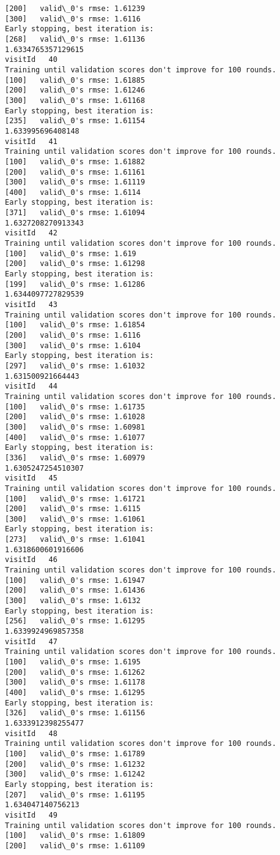 \documentclass[11pt]{article}
\begin{document}
\begin{Verbatim}[commandchars=\\\{\}]
[200]	valid\_0's rmse: 1.61239
[300]	valid\_0's rmse: 1.6116
Early stopping, best iteration is:
[268]	valid\_0's rmse: 1.61136
1.6334765357129615
visitId   40
Training until validation scores don't improve for 100 rounds.
[100]	valid\_0's rmse: 1.61885
[200]	valid\_0's rmse: 1.61246
[300]	valid\_0's rmse: 1.61168
Early stopping, best iteration is:
[235]	valid\_0's rmse: 1.61154
1.633995696408148
visitId   41
Training until validation scores don't improve for 100 rounds.
[100]	valid\_0's rmse: 1.61882
[200]	valid\_0's rmse: 1.61161
[300]	valid\_0's rmse: 1.61119
[400]	valid\_0's rmse: 1.6114
Early stopping, best iteration is:
[371]	valid\_0's rmse: 1.61094
1.6327208270913343
visitId   42
Training until validation scores don't improve for 100 rounds.
[100]	valid\_0's rmse: 1.619
[200]	valid\_0's rmse: 1.61298
Early stopping, best iteration is:
[199]	valid\_0's rmse: 1.61286
1.6344097727829539
visitId   43
Training until validation scores don't improve for 100 rounds.
[100]	valid\_0's rmse: 1.61854
[200]	valid\_0's rmse: 1.6116
[300]	valid\_0's rmse: 1.6104
Early stopping, best iteration is:
[297]	valid\_0's rmse: 1.61032
1.631500921664443
visitId   44
Training until validation scores don't improve for 100 rounds.
[100]	valid\_0's rmse: 1.61735
[200]	valid\_0's rmse: 1.61028
[300]	valid\_0's rmse: 1.60981
[400]	valid\_0's rmse: 1.61077
Early stopping, best iteration is:
[336]	valid\_0's rmse: 1.60979
1.6305247254510307
visitId   45
Training until validation scores don't improve for 100 rounds.
[100]	valid\_0's rmse: 1.61721
[200]	valid\_0's rmse: 1.6115
[300]	valid\_0's rmse: 1.61061
Early stopping, best iteration is:
[273]	valid\_0's rmse: 1.61041
1.6318600601916606
visitId   46
Training until validation scores don't improve for 100 rounds.
[100]	valid\_0's rmse: 1.61947
[200]	valid\_0's rmse: 1.61436
[300]	valid\_0's rmse: 1.6132
Early stopping, best iteration is:
[256]	valid\_0's rmse: 1.61295
1.6339924969857358
visitId   47
Training until validation scores don't improve for 100 rounds.
[100]	valid\_0's rmse: 1.6195
[200]	valid\_0's rmse: 1.61262
[300]	valid\_0's rmse: 1.61178
[400]	valid\_0's rmse: 1.61295
Early stopping, best iteration is:
[326]	valid\_0's rmse: 1.61156
1.6333912398255477
visitId   48
Training until validation scores don't improve for 100 rounds.
[100]	valid\_0's rmse: 1.61789
[200]	valid\_0's rmse: 1.61232
[300]	valid\_0's rmse: 1.61242
Early stopping, best iteration is:
[207]	valid\_0's rmse: 1.61195
1.634047140756213
visitId   49
Training until validation scores don't improve for 100 rounds.
[100]	valid\_0's rmse: 1.61809
[200]	valid\_0's rmse: 1.61109

\end{Verbatim}
\end{document}
